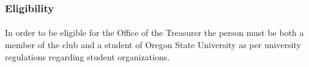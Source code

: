 \documentclass[12pt]{article}
\begin{document}
\subsubsection{Eligibility}
\paragraph{}
In order to be eligible for the Office of the Treasurer the person must be both a member of the club and a student of Oregon State University as per university regulations regarding student organizations.
\end{document}
